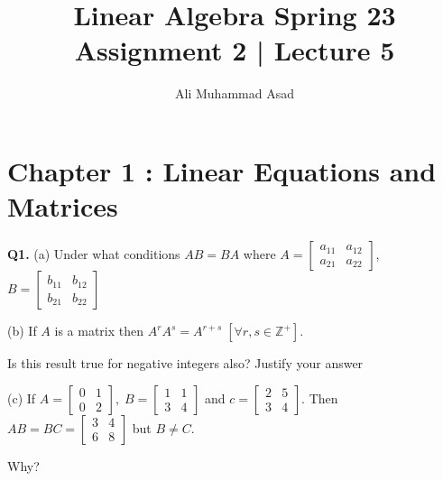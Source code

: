 \documentclass[addpoints]{exam}
\title{Linear Algebra Spring 23\\ Assignment 2 | Lecture 5}
\author{Ali Muhammad Asad}
\begin{document}
\maketitle
\begin{sloppypar}
\section*{\textbf{Chapter 1 : Linear Equations and Matrices}}
\begin{questions}
    \question
    \textbf{Q1. } (a) Under what conditions $ AB = BA $ where $ A = \begin{bmatrix}
        a_{11} & a_{12} \\ a_{21} & a_{22}
    \end{bmatrix} $, $ B = \begin{bmatrix}
        b_{11} & b_{12} \\ b_{21} & b_{22}
    \end{bmatrix} $ 

    \hspace{8.2mm} (b) If $A$ is a matrix then $ A^rA^s = A^{r + s}  \; [\forall r, s \in \mathbb{Z^+}]$. 
    
    \hspace{14mm} Is this result true for negative integers also? Justify your answer

    \hspace{8.2mm} (c) If $ A = \begin{bmatrix}
        0 & 1 \\ 0 & 2
    \end{bmatrix}, \; B = \begin{bmatrix}
        1 & 1 \\ 3 & 4
    \end{bmatrix} $ and $ c = \begin{bmatrix}
        2 & 5 \\ 3 & 4
    \end{bmatrix} $. Then $ AB = BC = \begin{bmatrix}
        3 & 4 \\ 6 & 8
    \end{bmatrix} $ but $ B \neq C $. 
    
    \hspace{14mm} Why?
    \begin{solution}
        \begin{parts}

\end{parts}
\end{solution}
\end{questions}
\end{sloppypar}
\end{document}
